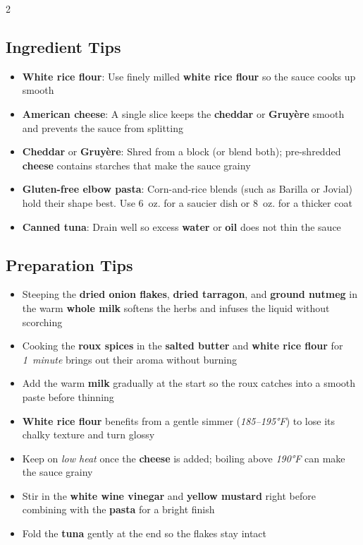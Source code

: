 \documentclass[11pt,letterpaper]{article}
\begin{document}
{\begin{multicols}{2}
\subsection*{Ingredient Tips}
\begin{itemize}
    \item \textbf{White rice flour}: Use finely milled \textbf{white rice flour} so the sauce cooks up smooth
    \item \textbf{American cheese}: A single slice keeps the \textbf{cheddar} or \textbf{Gruyère} smooth and prevents the sauce from splitting
    \item \textbf{Cheddar} or \textbf{Gruyère}: Shred from a block (or blend both); pre-shredded \textbf{cheese} contains starches that make the sauce grainy
    \item \textbf{Gluten-free elbow pasta}: Corn-and-rice blends (such as Barilla or Jovial) hold their shape best. Use 6~oz. for a saucier dish or 8~oz. for a thicker coat
    \item \textbf{Canned tuna}: Drain well so excess \textbf{water} or \textbf{oil} does not thin the sauce
\end{itemize}

\subsection*{Preparation Tips}
\begin{itemize}
    \item Steeping the \textbf{dried onion flakes}, \textbf{dried tarragon}, and \textbf{ground nutmeg} in the warm \textbf{whole milk} softens the herbs and infuses the liquid without scorching
    \item Cooking the \textbf{roux spices} in the \textbf{salted butter} and \textbf{white rice flour} for \textit{1~minute} brings out their aroma without burning
    \item Add the warm \textbf{milk} gradually at the start so the roux catches into a smooth paste before thinning
    \item \textbf{White rice flour} benefits from a gentle simmer (\textit{185--195°F}) to lose its chalky texture and turn glossy
    \item Keep on \textit{low heat} once the \textbf{cheese} is added; boiling above \textit{190°F} can make the sauce grainy
    \item Stir in the \textbf{white wine vinegar} and \textbf{yellow mustard} right before combining with the \textbf{pasta} for a bright finish
    \item Fold the \textbf{tuna} gently at the end so the flakes stay intact
\end{itemize}


\end{multicols}}
\end{document}
